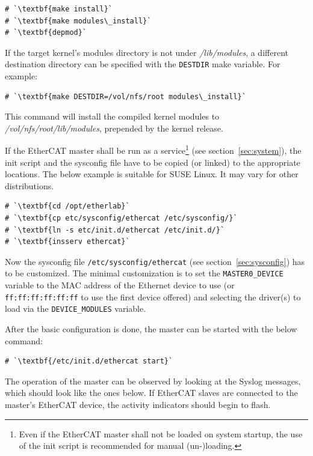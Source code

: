 \documentclass[a4paper,12pt,BCOR6mm,bibtotoc,idxtotoc]{scrbook}
\begin{document}
\begin{lstlisting}
# `\textbf{make install}`
# `\textbf{make modules\_install}`
# `\textbf{depmod}`
\end{lstlisting}

If the target kernel's modules directory is not under \textit{/lib/modules}, a
different destination directory can be specified with the \lstinline+DESTDIR+
make variable. For example:

\begin{lstlisting}
# `\textbf{make DESTDIR=/vol/nfs/root modules\_install}`
\end{lstlisting}

This command will install the compiled kernel modules to
\textit{/vol/nfs/root/lib/modules}, prepended by the kernel release.

If the EtherCAT master shall be run as a service\footnote{Even if the EtherCAT
master shall not be loaded on system startup, the use of the init script is
recommended for manual (un-)loading.} (see section~\ref{sec:system}), the init
script and the sysconfig file have to be copied (or linked) to the appropriate
locations. The below example is suitable for SUSE Linux. It may vary for other
distributions.

\begin{lstlisting}
# `\textbf{cd /opt/etherlab}`
# `\textbf{cp etc/sysconfig/ethercat /etc/sysconfig/}`
# `\textbf{ln -s etc/init.d/ethercat /etc/init.d/}`
# `\textbf{insserv ethercat}`
\end{lstlisting}

Now the sysconfig file \texttt{/etc/sysconfig/ethercat} (see
section~\ref{sec:sysconfig}) has to be customized. The minimal customization
is to set the \lstinline+MASTER0_DEVICE+ variable to the MAC address of the
Ethernet device to use (or \lstinline+ff:ff:ff:ff:ff:ff+ to use the first
device offered) and selecting the driver(s) to load via the
\lstinline+DEVICE_MODULES+ variable.

After the basic configuration is done, the master can be started with
the below command:

\begin{lstlisting}
# `\textbf{/etc/init.d/ethercat start}`
\end{lstlisting}

The operation of the master can be observed by looking at the
Syslog messages, which should look like the ones below.  If
EtherCAT slaves are connected to the master's EtherCAT device, the activity
indicators should begin to flash.
\end{document}
